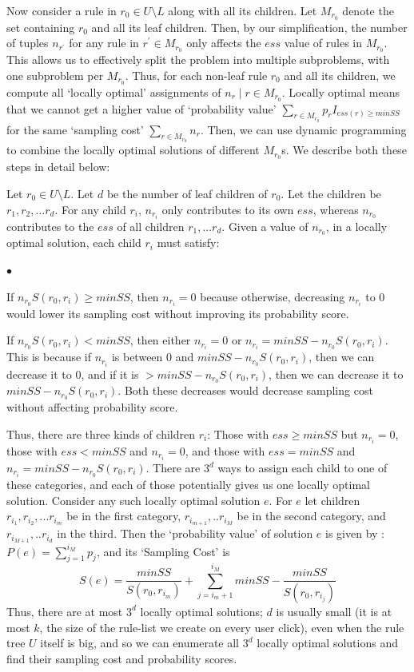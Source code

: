 \documentclass[10pt,journal,compsoc]{IEEEtran}
\newcounter{prob}
\newcommand{\squishlist}{
   \begin{list}{$\bullet$}
    { \setlength{\itemsep}{0pt}
      \setlength{\parsep}{2pt}
      \setlength{\topsep}{2pt}
      \setlength{\partopsep}{0pt}
    }
}
\newcommand{\squishend}{\end{list}}
\newcommand{\techreporttext}[1]{#1}
\begin{document}
\techreporttext{
Now consider a rule in $r_0 \in U \setminus L$ along with all its children. Let $M_{r_0}$ denote the set containing $r_0$ and all its leaf children. Then, by our simplification, the number of tuples $n_{r^{\prime}}$ for any rule in $r^{\prime} \in M_{r_0}$ only affects the $ess$ value of rules in $M_{r_0}$. This allows us to effectively split the problem into multiple subproblems,  with one subproblem per $M_{r_0}$. Thus, for each non-leaf rule $r_0$ and all its children, we compute all `locally optimal' assignments of $n_r \mid r \in M_{r_0}$. Locally optimal means that we cannot get a higher value of `probability value' $\sum_{r \in M_{r_0}} p_rI_{ess(r) \geq minSS}$ for the same `sampling cost' $\sum_{r\in M_{r_0}} n_r$. Then, we can use dynamic programming to combine the locally optimal solutions of different $M_{r_0}$s. We describe both these steps in detail below:

Let $r_0 \in U \setminus L$. Let $d$ be the number of leaf children of $r_0$. Let the children be $r_1, r_2, ... r_d$. For any child $r_i$, $n_{r_i}$ only contributes to its own $ess$, whereas $n_{r_0}$ contributes to the $ess$ of all children $r_1, ... r_d$. Given a value of $n_{r_0}$, in a locally optimal solution, each child $r_i$ must satisfy:
\squishlist
\item If $n_{r_0}S(r_0, r_i) \geq minSS$, then $n_{r_i} = 0$ because otherwise, decreasing $n_{r_i}$ to $0$ would lower its sampling cost without improving its probability score. 
\item If $n_{r_0}S(r_0, r_i) < minSS$, then either $n_{r_i} = 0$ or $n_{r_i} = minSS - n_{r_0}S(r_0, r_i)$. This is because if $n_{r_i}$ is between $0$ and $minSS - n_{r_0}S(r_0, r_i)$, then we can decrease it to $0$, and if it is $> minSS - n_{r_0}S(r_0, r_i)$, then we can decrease it to $minSS - n_{r_0}S(r_0, r_i)$. Both these decreases would decrease sampling cost without affecting probability score. 
\squishend
Thus, there are three kinds of children $r_i$: Those with $ess \geq minSS$ but $n_{r_i} = 0$, those with $ess < minSS$ and $n_{r_i} = 0$, and those with $ess = minSS$ and $n_{r_i} = minSS - n_{r_0}S(r_0, r_i)$. There are $3^d$ ways to assign each child to one of these categories, and each of those potentially gives us one locally optimal solution. Consider any such locally optimal solution $e$. For $e$ let children $r_{i_1}, r_{i_2}, ... r_{i_m}$ be in the first category, $r_{i_{m+1}}, .. r_{i_M}$ be in the second category, and $r_{i_{M+1}}, .. r_{i_d}$ in the third.  Then the `probability value' of solution $e$ is given by : 
$P(e) = \sum_{j = 1}^{i_M}p_{j}$,
and its `Sampling Cost' is
$$S(e) = \frac{minSS}{S(r_0, r_{i_m})} + \sum_{j=i_m+1}^{i_M} minSS - \frac{minSS}{S(r_0, r_{i_j})}$$
Thus, there are at most $3^d$ locally optimal solutions; $d$ is usually small (it is at most $k$, the size of the rule-list we create on every user click), even when the rule tree $U$ itself is big, and so we can enumerate all $3^d$ locally optimal solutions and find their sampling cost and probability scores.

}
\end{document}
